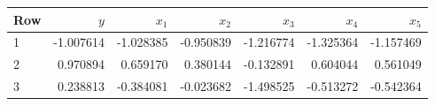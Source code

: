 \begin{center}
\small
\setlength{\tabcolsep}{4pt}
\begin{tabular}{lrrrrrr}
\toprule
Row & $y$ & $x_1$ & $x_2$ & $x_3$ & $x_4$ & $x_5$ \\
\midrule
1 & -1.007614 & -1.028385 & -0.950839 & -1.216774 & -1.325364 & -1.157469 \\
2 & 0.970894 & 0.659170 & 0.380144 & -0.132891 & 0.604044 & 0.561049 \\
3 & 0.238813 & -0.384081 & -0.023682 & -1.498525 & -0.513272 & -0.542364 \\
\bottomrule
\end{tabular}
\end{center}
